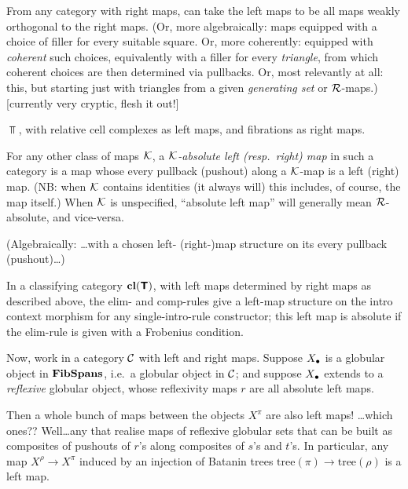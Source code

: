 \documentclass{amsart}
\newcommand{\tr}{\mathrm{tree}}
\begin{document}
\begin{example} \label{ex:left-maps-from-right} From any category with right maps, can take the left maps to be all maps weakly orthogonal to the right maps.  (Or, more algebraically: maps equipped with a choice of filler for every suitable square.  Or, more coherently: equipped with \emph{coherent} such choices, equivalently with a filler for every \emph{triangle}, from which coherent choices are then determined via pullbacks.  Or, most relevantly at all: this, but starting just with triangles from a given \emph{generating set} or $\mathcal{R}$-maps.) [currently very cryptic, flesh it out!]
\end{example}

\begin{example}$\Top$, with relative cell complexes as left maps, and fibrations as right maps.
\end{example}

\begin{definition}For any other class of maps $\mathcal{K}$, a \emph{$\mathcal{K}$-absolute left (resp.\ right) map} in such a category is a map whose every pullback (pushout) along a $\mathcal{K}$-map is a left (right) map.  (NB: when $\mathcal{K}$ contains identities (it always will) this includes, of course, the map itself.)  When $\mathcal{K}$ is unspecified, ``absolute left map'' will generally mean $\mathcal{R}$-absolute, and vice-versa.

(Algebraically: \ldots with a chosen left- (right-)map structure on its every pullback (pushout)\ldots)  
\end{definition}

\begin{example}In a classifying category $\mathbf{cl}(\textbf{\textsf{T}})$, with left maps determined by right maps as described above, the elim- and comp-rules give a left-map structure on the intro context morphism for any single-intro-rule constructor; this left map is absolute if the elim-rule is given with a Frobenius condition.
\end{example}

Now, work in a category $\mathcal{C}$ with left and right maps.  Suppose $X_\bullet$ is a globular object in $\mathbf{FibSpans}$, i.e.\ a globular object in $\mathcal{C}$; and suppose $X_\bullet$ extends to a \emph{reflexive} globular object, whose reflexivity maps $r$ are all absolute left maps.

Then a whole bunch of maps between the objects $X^\pi$ are also left maps!  \ldots which ones??  Well\ldots any that realise maps of reflexive globular sets that can be built as composites of pushouts of $r$'s along composites of $s$'s and $t$'s.  In particular, any map $X^\rho \to X^\pi$ induced by an injection of Batanin trees $\tr(\pi) \to \tr(\rho)$ is a left map.
\end{document}
